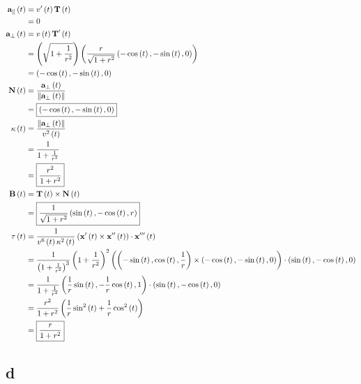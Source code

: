 \documentclass{article}
\begin{document}
\begin{align*}
  \textbf{a}_{\parallel} \left ( t \right) &= v' \left ( t \right) \textbf{T} \left ( t \right) \\
  &= 0 \\
  \textbf{a}_{\perp} \left ( t \right) &= v \left ( t \right) \textbf{T}' \left ( t \right) \\
                              &= \left ( \sqrt{1 + \frac{1}{r^2}} \right) \left ( \frac{r}{\sqrt{1+r^2}} \left ( - \cos \left ( t \right), - \sin \left ( t \right), 0 \right) \right) \\
                              &= \left ( - \cos \left ( t \right), - \sin \left ( t \right), 0 \right) \\
  \textbf{N} \left ( t \right) &= \frac{\textbf{a}_{\perp} \left ( t \right)}{\left\lVert\textbf{a}_{\perp} \left ( t \right)\right\rVert} \\
                              &= \boxed{\left ( - \cos \left ( t \right), - \sin \left ( t \right), 0 \right)} \\
  \kappa \left ( t \right) &= \frac{ \left\lVert\textbf{a}_{\perp} \left ( t \right)\right\rVert }{v^2 \left ( t \right)} \\
                              &= \frac{1}{1 + \frac{1}{r^2}} \\
                              &= \boxed{\frac{r^2}{1+r^2}} \\
  \textbf{B} \left ( t \right) &= \textbf{T} \left ( t \right) \times \textbf{N} \left ( t \right) \\
                              &= \boxed{\frac{1}{\sqrt{1+r^2}} \left ( \sin \left ( t \right), - \cos \left ( t \right), r \right)} \\
  \tau \left ( t \right) &= \frac{1}{v^6 \left ( t \right) \kappa^2 \left ( t \right)} \left ( \textbf{x}' \left ( t \right) \times \textbf{x}'' \left ( t \right) \right) \cdot \textbf{x}''' \left ( t \right) \\
                              &= \frac{1}{\left ( 1 + \frac{1}{r^2} \right)^3} \left ( 1 + \frac{1}{r^2} \right)^2 \left ( \left ( - \sin \left ( t \right), \cos \left ( t \right), \frac{1}{r} \right) \times \left ( - \cos \left ( t \right), - \sin \left ( t \right), 0 \right) \right) \cdot \left ( \sin \left ( t \right), - \cos \left ( t \right), 0 \right) \\
                              &= \frac{1}{1 + \frac{1}{r^2}} \left ( \frac{1}{r} \sin \left ( t \right), - \frac{1}{r} \cos \left ( t \right), 1 \right) \cdot \left ( \sin \left ( t \right), - \cos \left ( t \right), 0 \right) \\
                              &= \frac{r^2}{1+r^2} \left ( \frac{1}{r} \sin^2 \left ( t \right) + \frac{1}{r} \cos^2 \left ( t \right) \right) \\
                              &= \boxed{\frac{r}{1+r^2}} \\
\end{align*}

\subsection*{d}
\end{document}
